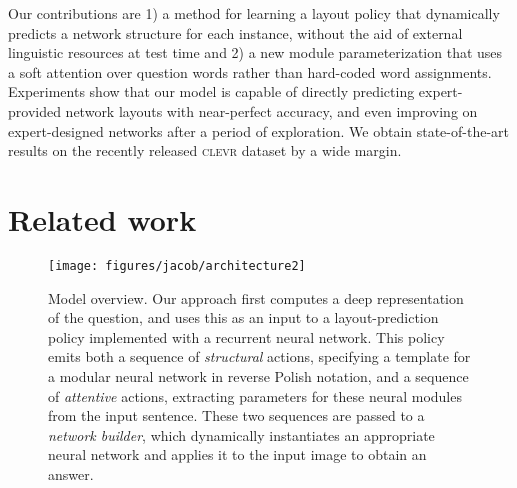 \documentclass[10pt,twocolumn,letterpaper]{article}
\newcommand{\clevr}{\textsc{clevr}\xspace}
\begin{document}
Our contributions are 1) a method for learning a layout policy that dynamically predicts a network structure for each instance, without the aid of external linguistic resources at test time and 2) a new module parameterization that uses a soft attention over question words rather than hard-coded word assignments. Experiments show that our model is capable of directly predicting expert-provided network layouts with near-perfect accuracy, and even improving on expert-designed networks after a period of exploration. We obtain state-of-the-art results on the recently released \clevr dataset by a wide margin.

\section{Related work}

\begin{figure*}[t]
\centering
\vspace{-0.5cm}
\texttt{[image: figures/jacob/architecture2]}\vspace{-0.2cm}
\caption{Model overview. Our approach first computes a deep representation
   of the question, and uses this as an input to a layout-prediction policy
   implemented with a recurrent neural network. This policy emits both a 
   sequence of \emph{structural} actions, specifying a template for a modular
   neural network in reverse Polish notation, and a sequence of 	
   \emph{attentive} actions, extracting parameters for these neural modules from
   the input sentence. These two sequences are passed to a \emph{network 	    
   builder}, which dynamically instantiates an appropriate neural network
   and applies it to the input image to obtain an answer.}
\label{fig:method}
\vspace{-0.5cm}
\end{figure*}
\end{document}
